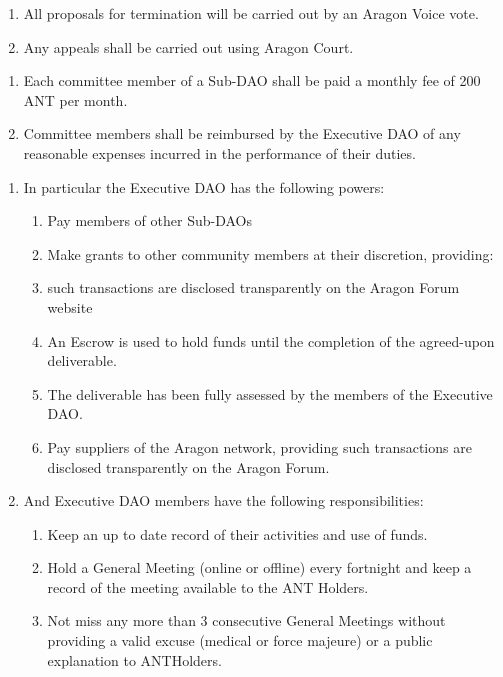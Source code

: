 \begin{enumerate}
\begin{enumerate}
\begin{enumerate}
\begin{enumerate}
				\item All proposals for termination will be carried out by an Aragon Voice vote.
				\item Any appeals shall be carried out using Aragon Court.
			\end{enumerate}
			\begin{enumerate}
				\item Each committee member of a Sub-\ac{DAO} shall be paid a monthly fee of 200 ANT per month.
				\item Committee members shall be reimbursed by the Executive \ac{DAO} of any reasonable expenses incurred in the performance of their duties.
			\end{enumerate}
		\end{enumerate}
	\end{enumerate}
	
	\begin{enumerate}
		\begin{enumerate}
			\item In particular the Executive \ac{DAO} has the following powers:
			\begin{enumerate}
				\item Pay members of other Sub-\ac{DAO}s
				\item Make grants to other community members at their discretion, providing:
				\item such transactions are disclosed transparently on the Aragon Forum website
				\item An Escrow is used to hold funds until the completion of the agreed-upon deliverable.
				\item The deliverable has been fully assessed by the members of the Executive \ac{DAO}.
				\item Pay suppliers of the Aragon network, providing such transactions are disclosed transparently on the Aragon Forum.
			\end{enumerate}
			
			\item And Executive \ac{DAO} members have the following responsibilities:
			\begin{enumerate}
				\item Keep an up to date record of their activities and use of funds.
				\item Hold a General Meeting (online or offline) every fortnight and keep a record of the meeting available to the ANT Holders.
				\item Not miss any more than 3 consecutive General Meetings without providing a valid excuse (medical or force majeure) or a public explanation to \glspl{ANTHolder}.
			\end{enumerate}


\end{enumerate}
\end{enumerate}
\end{enumerate}
